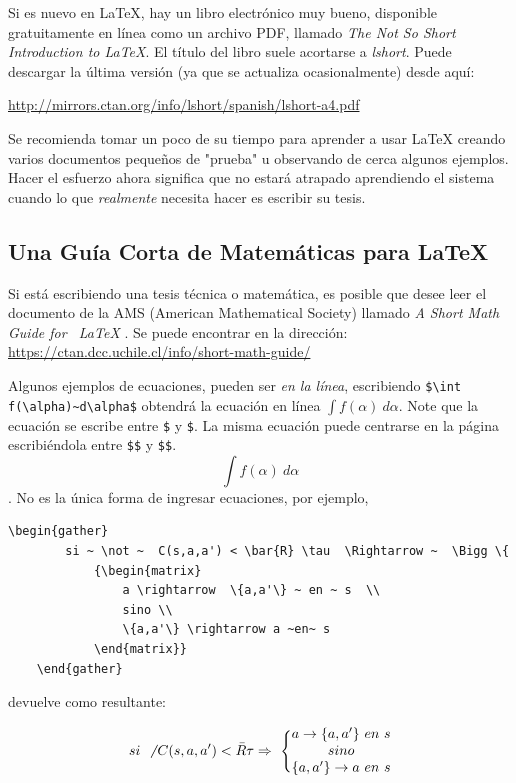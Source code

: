 Si es nuevo en \LaTeX{}, hay un libro electrónico muy bueno, disponible gratuitamente en línea como un archivo PDF, llamado \textit {The Not So Short Introduction to \LaTeX{}}. El título del libro suele acortarse a  \emph{lshort}. Puede descargar la última versión (ya que se actualiza ocasionalmente) desde aquí:

\url{http://mirrors.ctan.org/info/lshort/spanish/lshort-a4.pdf}

Se recomienda tomar un poco de su tiempo para aprender a usar  \LaTeX{} creando varios documentos pequeños de "prueba" u observando de cerca algunos ejemplos. Hacer el esfuerzo ahora significa que no estará atrapado aprendiendo el sistema cuando lo que \emph{realmente} necesita hacer es escribir su tesis.


\subsection{Una Guía Corta de Matemáticas para \LaTeX{}}

Si está escribiendo una tesis técnica o matemática, es posible que desee leer el documento de la AMS (American Mathematical Society) llamado \textit{A Short Math Guide for \ LaTeX {}}. Se puede encontrar en la dirección:
\url {https://ctan.dcc.uchile.cl/info/short-math-guide/}

Algunos ejemplos de ecuaciones, pueden ser \emph{en la línea}, escribiendo \verb*|$\int f(\alpha)~d\alpha$| obtendrá la ecuación en línea  $\int f(\alpha)~d\alpha$. Note que la ecuación se escribe entre \verb|$| y \verb|$|. La misma ecuación puede centrarse en la página escribiéndola entre \verb|$$| y \verb|$$|. $$\int f(\alpha)~d\alpha$$. No es la única forma de ingresar ecuaciones,  por ejemplo,

\begin{lstlisting}[basicstyle=\small,tabsize=4]
	\begin{gather}
		si ~ \not ~  C(s,a,a') < \bar{R} \tau  \Rightarrow ~  \Bigg \{ 
			{\begin{matrix}
				a \rightarrow  \{a,a'\} ~ en ~ s  \\
				sino \\
				\{a,a'\} \rightarrow a ~en~ s
			\end{matrix}}
	\end{gather}
\end{lstlisting}
 
 devuelve como resultante:
 
 \begin{gather}
 	si ~ \not ~  C(s,a,a') < \bar{R} \tau  \Rightarrow ~  \Bigg \{ 
 		{\begin{matrix}
 			a \rightarrow  \{a,a'\} ~ en ~ s  \\
 			sino \\
 			\{a,a'\} \rightarrow a ~en~ s
 		\end{matrix}}
 \end{gather}

